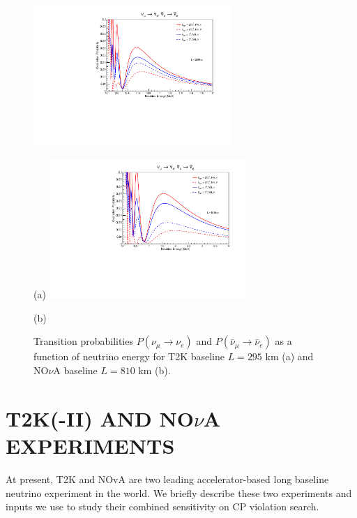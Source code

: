 \documentclass[a4 paper,12pt]{report}%
\def\Mr{\uppercase}
\begin{document}
  \begin{figure}
 	\centering
 	\includegraphics[width=7.5cm]{prob_t2k_compare.pdf} 
 	\caption*{}{(a)}
 \endminipage
 \hfill
\quad
 \centering
 \includegraphics[width=7.5cm]{prob_nova_compare.pdf}
 \caption*{}{(b)}
 \endminipage
  \caption{{\label{fig1}} Transition probabilities $P(\nu_\mu \rightarrow \nu_e)$ and $P(\bar{\nu}_\mu \rightarrow \bar{\nu}_e)$ as a function of neutrino energy for T2K baseline $L=295$ km (a) and NO$\nu$A baseline $L=810$ km (b).}
 \hfill
 \end{figure}
 

\section{\Mr{T2K(-II) and NO$\nu$A experiments}} \label{sec:t2knova}
At present, T2K and NOvA are two leading accelerator-based long baseline neutrino experiment in the world. We briefly describe these two experiments and inputs we use to study their combined sensitivity on CP violation search.\par
\end{document}
